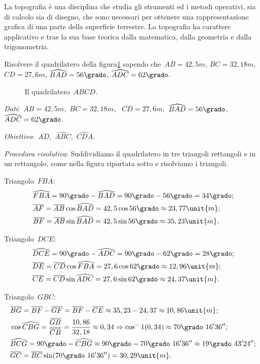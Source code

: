 La topografia è una disciplina che studia gli strumenti ed i metodi operativi, 
sia di calcolo sia di disegno, che sono necessari per ottenere
una rappresentazione grafica di una parte della superficie terrestre.
La topografia ha carattere applicativo e trae la sua base teorica dalla 
matematica, dalla geometria e dalla trigonometria.

\begin{exrig}
 \begin{esempio}
Risolvere il quadrilatero della figura\ref{fig:G.7} sapendo 
che~$AB=42,5\unit{m}$, $BC=32,18\unit{m}$, $CD=27,6\unit{m}$,
$\widehat{BAD}=56\grado$, $\widehat{ADC}=62\grado$.
\begin{inaccessibleblock}
 \begin{figure}[t]
\centering

\caption{Il quadrilatero~$ABCD$.}\label{fig:G.7}
\end{figure}
\end{inaccessibleblock}

\emph{Dati}:~$\overline{AB}=42,5\unit{m}$,\quad~$\overline{BC}=32,18\unit{m}$,
\quad~$\overline{CD}=27,6\unit{m}$,\quad~$\widehat{BAD}=56\grado$,
\quad~$\widehat{ADC}=62\grado$.

\emph{Obiettivo}:~$\overline{AD}$,\quad~$\widehat{ABC}$,\quad~$\widehat{CDA}$.

\emph{Procedura risolutiva}:
Suddividiamo il quadrilatero in tre triangoli rettangoli e in un rettangolo, 
come nella figura riportata sotto e risolviamo i triangoli.

Triangolo~$FBA$:
\begin{align*}
&\widehat{FBA}=90\grado-\widehat{BAD}=90\grado-56\grado=34\grado;\\
&\overline{AF}=\overline{AB}\cos \widehat{BAD} = 42,5\cos 56\grado \approx23,
77\unit{m};\\
&\overline{BF}=\overline{AB}\sin \widehat{BAD} =42,5 \sin 56\grado\approx35,
23\unit{m}.
\end{align*}

Triangolo~$DCE$:
\begin{align*}
 &\widehat{DCE}=90\grado-\widehat{ADC}=90\grado-62\grado=28\grado;\\
&\overline{DE}=\overline{CD}\cos \widehat{FBA}=27,6\cos 62\grado \approx12,
96\unit{m};\\
&\overline{CE}=\overline{CD}\sin \widehat{ADC} =27,6 \sin 62\grado \approx24,
37\unit{m}.
\end{align*}

Triangolo~$GBC$:
\begin{align*}
&\overline{BG}=\overline{BF}-\overline{GF}=\overline{BF}-\overline{CE}\approx35,
23-24,37\approx10,86\unit{m};\\
&\cos \widehat{CBG}=\frac{\overline{GB}}{\overline{CB}}=\frac{10,86}{32,18}
\approx0,34\Rightarrow\cos^-1(0,34)\approx70\grado~16' 36'';\\
&\widehat{BCG}=90\grado-\widehat{CBG}\approx90\grado-70\grado~16' 
36''\approx19\grado~43' 24'';\\
&\overline{GC}=\overline{BC}\sin (70\grado~16' 36'')=30,29\unit{m}.
\end{align*}


\end{esempio}
\end{exrig}
